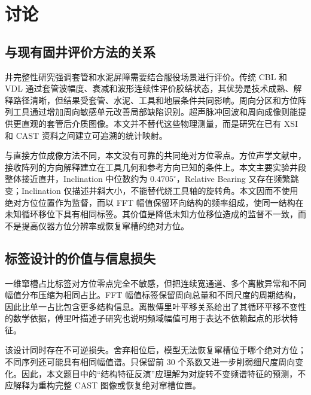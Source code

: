 \chapter{讨\hspace{6pt}论}

\section{与现有固井评价方法的关系}

井完整性研究强调套管和水泥屏障需要结合服役场景进行评价\cite{Kiran2017WellIntegrityReview,Bai2016WellIntegrityReview}。传统 CBL 和 VDL 通过套管波幅度、衰减和波形连续性评价胶结状态，其优势是技术成熟、解释路径清晰，但结果受套管、水泥、工具和地层条件共同影响\cite{Pardue1963CementBond,Wang2016AcousticCementMethods}。周向分区和方位阵列工具通过增加周向敏感单元改善局部缺陷识别\cite{Bigelow1990SegmentedBond,Lu2014AzimuthalAcoustic,Zuo2020AzimuthCement}。超声脉冲回波和周向成像则能提供更直观的套管后介质图像\cite{Froelich1982CementEvaluation,VanKuijk2005UltrasonicImager}。本文并不替代这些物理测量，而是研究在已有 XSI 和 CAST 资料之间建立可追溯的统计映射。

与直接方位成像方法不同，本文没有可靠的共同绝对方位零点。方位声学文献中，接收阵列的方向解释建立在工具几何和参考方向已知的条件上\cite{Che2014PhasedArcReception,Che2017AzimuthalReceiver}。本文主要实验井段整体接近直井，Inclination 中位数约为 $0.4705^\circ$，Relative Bearing 又存在频繁跳变；Inclination 仅描述井斜大小，不能替代绕工具轴的旋转角。本文因而不使用绝对方位位置作为监督，而以 FFT 幅值保留环向结构的频率组成，使同一结构在未知循环移位下具有相同标签。其价值是降低未知方位移位造成的监督不一致，而不是提高仪器方位分辨率或恢复窜槽的绝对方位。

\section{标签设计的价值与信息损失}

一维窜槽占比标签对方位零点完全不敏感，但把连续宽通道、多个离散异常和不同幅值分布压缩为相同占比。FFT 幅值标签保留周向总量和不同尺度的周期结构，因此比单一占比包含更多结构信息。离散傅里叶平移关系给出了其循环平移不变性的数学依据，傅里叶描述子研究也说明频域幅值可用于表达不依赖起点的形状特征\cite{Zahn1972FourierDescriptors,Persoon1977FourierDescriptors,Kuhl1982EllipticFourier}。

该设计同时存在不可逆损失。舍弃相位后，模型无法恢复窜槽位于哪个绝对方位；不同序列还可能具有相同幅值谱。只保留前 30 个系数又进一步削弱细尺度周向变化。因此，本文题目中的“结构特征反演”应理解为对旋转不变频谱特征的预测，不应解释为重构完整 CAST 图像或恢复绝对窜槽位置。

